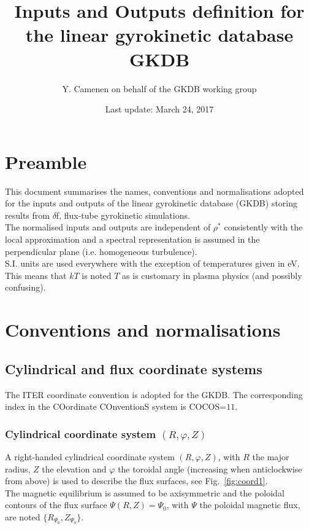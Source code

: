 \documentclass[fleqn]{report}
\begin{document}
\title{Inputs and Outputs definition for the linear gyrokinetic database GKDB}

\author{Y. Camenen on behalf of the GKDB working group}

\date{Last update: March 24, 2017}

\maketitle


\chapter{Preamble}

This document summarises the names, conventions and normalisations adopted for the inputs and outputs of the linear gyrokinetic database (GKDB) storing results from $\delta$f, flux-tube gyrokinetic simulations.\\ 

The normalised inputs and outputs are independent of $\rho^*$ consistently with the local approximation and a spectral representation is assumed in the perpendicular plane (i.e. homogeneous turbulence).\\

S.I. units are used everywhere with the exception of temperatures given in eV. This means that $kT$ is noted $T$ as is customary in plasma physics (and possibly confusing).



\chapter{Conventions and normalisations}
\label{chap:normdef}
\section{Cylindrical and flux coordinate systems}
The ITER coordinate convention is adopted for the GKDB. The corresponding index in the COordinate COnventionS system  \cite{Sauter:CPC2013} is COCOS=$11$.
\subsection{Cylindrical coordinate system $(R,\varphi,Z)$}
A right-handed cylindrical coordinate system $(R,\varphi,Z)$, with $R$ the major radius, $Z$ the elevation and $\varphi$ the toroidal angle (increasing when anticlockwise from above) is used to describe the flux surfaces, see Fig.~\ref{fig:coord1}. \\
The magnetic equilibrium is assumed to be axisymmetric and the poloidal contours of the flux surface $\Psi(R,Z)=\Psi_0$, with $\Psi$ the poloidal magnetic flux, are noted $\{R_{\Psi_0},Z_{\Psi_0}\}$.
\end{document}
